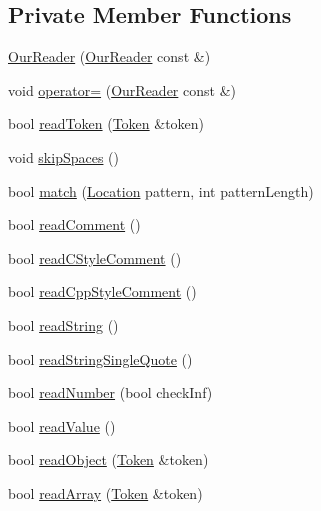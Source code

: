 \subsection*{Private Member Functions}
\begin{DoxyCompactItemize}
\item 
\hyperlink{classJson_1_1OurReader_aee013005522c0d34d2e14962851487ac}{Our\+Reader} (\hyperlink{classJson_1_1OurReader}{Our\+Reader} const \&)
\item 
void \hyperlink{classJson_1_1OurReader_ad418de7c47bd3d0510888e22110b796e}{operator=} (\hyperlink{classJson_1_1OurReader}{Our\+Reader} const \&)
\item 
bool \hyperlink{classJson_1_1OurReader_a0d1e66da47fe2e85f5033c59326dfdc3}{read\+Token} (\hyperlink{classJson_1_1OurReader_1_1Token}{Token} \&token)
\item 
void \hyperlink{classJson_1_1OurReader_a6fbc6d58a4505e5ccadf330b57b17ca5}{skip\+Spaces} ()
\item 
bool \hyperlink{classJson_1_1OurReader_a4a03f1b266def9b47c4fef35386557fb}{match} (\hyperlink{classJson_1_1OurReader_a1bdc7bbc52ba87cae6b19746f2ee0189}{Location} pattern, int pattern\+Length)
\item 
bool \hyperlink{classJson_1_1OurReader_a90f6bb9e55b2bc3d6c1880809495c222}{read\+Comment} ()
\item 
bool \hyperlink{classJson_1_1OurReader_aba784b125baa1b62387e767b791f2f89}{read\+C\+Style\+Comment} ()
\item 
bool \hyperlink{classJson_1_1OurReader_ae3de80671f0f997053e1c1c8a47a45c5}{read\+Cpp\+Style\+Comment} ()
\item 
bool \hyperlink{classJson_1_1OurReader_a5d39b12671499ec5975f3bbc84b7d438}{read\+String} ()
\item 
bool \hyperlink{classJson_1_1OurReader_ac78592defdc333faf56c6d0908758da3}{read\+String\+Single\+Quote} ()
\item 
bool \hyperlink{classJson_1_1OurReader_aefcb9a78cc45870ccac2db2a66c8ec50}{read\+Number} (bool check\+Inf)
\item 
bool \hyperlink{classJson_1_1OurReader_a1765d9670d191c89a57a22ea5591d35f}{read\+Value} ()
\item 
bool \hyperlink{classJson_1_1OurReader_aea198f8101dba55099f4d8121a993530}{read\+Object} (\hyperlink{classJson_1_1OurReader_1_1Token}{Token} \&token)
\item 
bool \hyperlink{classJson_1_1OurReader_a0b9f58faf4212c6ecb5d8e2a1ac10257}{read\+Array} (\hyperlink{classJson_1_1OurReader_1_1Token}{Token} \&token)

\end{DoxyCompactItemize}
